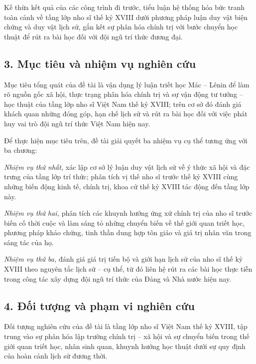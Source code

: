 Kế thừa kết quả của các công trình đi trước, tiểu luận hệ thống hóa bức tranh toàn cảnh về tầng lớp nho sĩ thế kỷ XVIII dưới phương pháp luận duy vật biện chứng và duy vật lịch sử, gắn kết sự phân hóa chính trị với bước chuyển học thuật để rút ra bài học đối với đội ngũ trí thức đương đại.

\subsection*{3. Mục tiêu và nhiệm vụ nghiên cứu}

Mục tiêu tổng quát của đề tài là vận dụng lý luận triết học Mác -- Lênin để làm rõ nguồn gốc xã hội, thực trạng phân hóa chính trị và sự vận động tư tưởng -- học thuật của tầng lớp nho sĩ Việt Nam thế kỷ XVIII; trên cơ sở đó đánh giá khách quan những đóng góp, hạn chế lịch sử và rút ra bài học đối với việc phát huy vai trò đội ngũ trí thức Việt Nam hiện nay.

Để thực hiện mục tiêu trên, đề tài giải quyết ba nhiệm vụ cụ thể tương ứng với ba chương:

\textit{Nhiệm vụ thứ nhất,} xác lập cơ sở lý luận duy vật lịch sử về ý thức xã hội và đặc trưng của tầng lớp trí thức; phân tích vị thế nho sĩ trước thế kỷ XVIII cùng những biến động kinh tế, chính trị, khoa cử thế kỷ XVIII tác động đến tầng lớp này.

\textit{Nhiệm vụ thứ hai,} phân tích các khuynh hướng ứng xử chính trị của nho sĩ trước biến cố thời cuộc và làm sáng tỏ những chuyển biến về thế giới quan triết học, phương pháp khảo chứng, tinh thần dung hợp tôn giáo và giá trị nhân văn trong sáng tác của họ.

\textit{Nhiệm vụ thứ ba,} đánh giá giá trị tiến bộ và giới hạn lịch sử của nho sĩ thế kỷ XVIII theo nguyên tắc lịch sử -- cụ thể, từ đó liên hệ rút ra các bài học thực tiễn trong công tác xây dựng đội ngũ trí thức của Đảng và Nhà nước hiện nay.

\subsection*{4. Đối tượng và phạm vi nghiên cứu}

Đối tượng nghiên cứu của đề tài là tầng lớp nho sĩ Việt Nam thế kỷ XVIII, tập trung vào sự phân hóa lập trường chính trị -- xã hội và sự chuyển biến trong thế giới quan triết học, nhân sinh quan, khuynh hướng học thuật dưới sự quy định của hoàn cảnh lịch sử đương thời.

